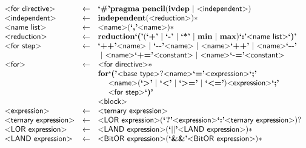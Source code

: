 \begin{figure}[h!]
  \ContinuedFloat
\[
\begin{array}{lcl}
  \pgrammar{for directive} & \gets & \plexer{\#} \pkeyword{pragma} ~ \pkeyword{pencil} (\pkeyword{ivdep} ~|~ \pgrammar{independent})\\

  \pgrammar{independent} & \gets & \pkeyword{independent} (\pgrammar{reduction})*\\

  \pgrammar{name list} & \gets & \pgrammar{name} (\plexer{,} \pgrammar{name})*\\
  \pgrammar{reduction} & \gets & \pkeyword{reduction} \plexer{(} (\plexer{+}~|~\plexer{-}~|~\plexer{*}~|~\pkeyword{min}~|~\pkeyword{max}) \plexer{:} \pgrammar{name list}\plexer{)}\\

  \pgrammar{for step} & \gets & \plexer{++} \pgrammar{name}
  ~|~ \plexer{{-}{-}} \pgrammar{name}
  ~|~ \pgrammar{name} \plexer{++}
  ~|~ \pgrammar{name} \plexer{{-}{-}}\\&&
  ~|~ \pgrammar{name} \plexer{{+}=} \pgrammar{constant}
  ~|~ \pgrammar{name} \plexer{{-}=} \pgrammar{constant}\\

  \pgrammar{for} & \gets & \pgrammar{for directive}*\\&& \pkeyword{for} \plexer{(}
  \pgrammar{base type}? \pgrammar{name} \plexer{=} \pgrammar{expression} \plexer{;}\\&&
    ~ ~ ~ ~\pgrammar{name} (\text{\plexer{\textgreater}}~|~\text{\plexer{\textless}}~|~\text{\plexer{\textgreater=}}~|~\text{\plexer{\textless=}}) \pgrammar{expression}\plexer{;}\\&&
    ~ ~ ~ ~\pgrammar{for step} \plexer{)}\\&&\pgrammar{block}\\

  \pgrammar{expression} & \gets & \pgrammar{ternary expression}\\

  \pgrammar{ternary expression} & \gets & \pgrammar{LOR expression}
  (\plexer{?} \pgrammar{expression} \plexer{:} \pgrammar{ternary expression})?\\

  \pgrammar{LOR expression} & \gets & \pgrammar{LAND expression} (\plexer{$||$} \pgrammar{LAND expression})*\\

  \pgrammar{LAND expression} & \gets & \pgrammar{BitOR expression} (\plexer{\&\&} \pgrammar{BitOR expression})*\\


\end{array}\]
\end{figure}

